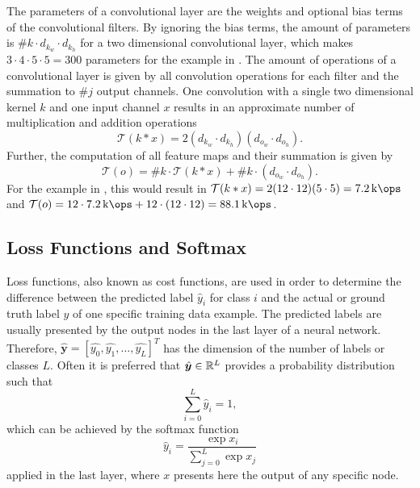 The parameters of a convolutional layer are the weights and optional bias terms of the convolutional filters.
By ignoring the bias terms, the amount of parameters is $\#k \cdot d_{k_w} \cdot d_{k_h}$ for a two dimensional convolutional layer, which makes $3 \cdot 4 \cdot 5 \cdot 5 = 300$ parameters for the example in .
The amount of operations of a convolutional layer is given by all convolution operations for each filter and the summation to $\#j$ output channels.
One convolution with a single two dimensional kernel $k$ and one input channel $x$ results in an approximate number of multiplication and addition operations
\begin{equation}
  \mathcal{T}(k * x) = 2(d_{k_w} \cdot d_{k_h}) (d_{o_w} \cdot d_{o_h}).
\end{equation}
Further, the computation of all feature maps and their summation is given by
\begin{equation}
  \mathcal{T}(o) = \#k \cdot \mathcal{T}(k * x) + \#k \cdot (d_{o_w} \cdot d_{o_h}).
\end{equation}
For the example in , this would result in $\mathcal{T}(k * x) = 2 (12 \cdot 12) (5 \cdot 5) = \SI{7.2}{\kilo\ops}$ and $\mathcal{T}(o) = 12 \cdot \SI{7.2}{\kilo\ops} + 12 \cdot (12 \cdot 12) = \SI{88.1}{\kilo\ops}$.



\subsection{Loss Functions and Softmax}
Loss functions, also known as cost functions, are used in order to determine the difference between the predicted label $\hat{y}_i$ for class $i$ and the actual or ground truth label $y$ of one specific training data example.
The predicted labels are usually presented by the output nodes in the last layer of a neural network.
Therefore, $\hat{\bm{y}} = [\hat{y_0}, \hat{y_1}, \dots, \hat{y_L}]^T$ has the dimension of the number of labels or classes $L$.
Often it is preferred that $\hat{\bm{y}} \in \mathbb{R}^L$ provides a probability distribution such that
\begin{equation}
  \sum_{i=0}^L \hat{y}_i = 1,
\end{equation}
which can be achieved by the softmax function
\begin{equation}\label{eq:nn_theory_softmax}
  \hat{y}_i = \frac{\exp{x_i}}{\sum_{j=0}^{L}\exp{x_j}}
\end{equation}
applied in the last layer, where $x$ presents here the output of any specific node.

